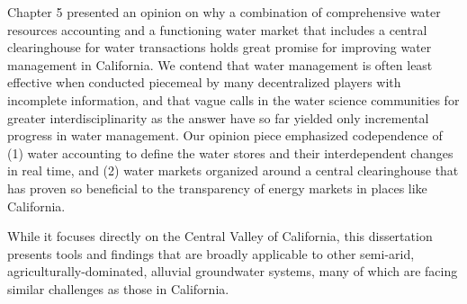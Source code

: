 Chapter 5 presented an opinion on why a combination of comprehensive water resources accounting and a functioning water market that includes a central clearinghouse for water transactions holds great promise for improving water management in California. We contend that water management is often least effective when conducted piecemeal by many decentralized players with incomplete information, and that vague calls in the water science communities for greater interdisciplinarity as the answer have so far yielded only incremental progress in water management. Our opinion piece emphasized codependence of (1) water accounting to define the water stores and their interdependent changes in real time, and (2) water markets organized around a central clearinghouse that has proven so beneficial to the transparency of energy markets in places like California. 

While it focuses directly on the Central Valley of California, this dissertation presents tools and findings that are broadly applicable to other semi-arid, agriculturally-dominated, alluvial groundwater systems, many of which are facing similar challenges as those in California.